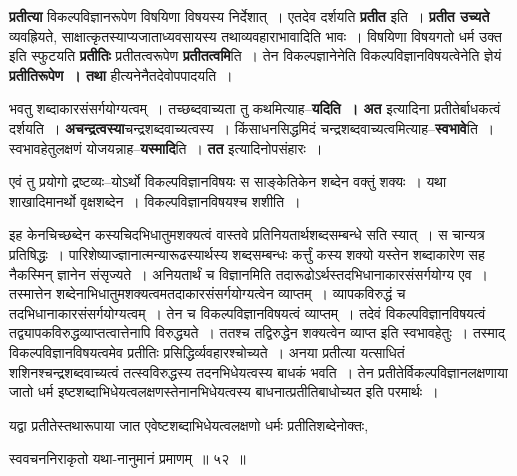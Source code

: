 \documentclass[article,12pt,a4paper]{memoir}
\begin{document}
	  \endgroup
	

	  \pstart \textbf{प्रतीत्या} विकल्पविज्ञानरूपेण विषयिणा विषयस्य निर्देशात् । एतदेव दर्शयति \textbf{प्रतीत} इति । \textbf{प्रतीत उच्यते} व्यवह्रियते, साक्षात्कृतस्याप्यजाताध्यवसायस्य तथाव्यवहाराभावादिति भावः । विषयिणा विषयगतो धर्म उक्त इति स्फुटयति \textbf{प्रतीतिः} प्रतीतत्वरूपेण \textbf{प्रतीतत्वमि}ति । तेन विकल्पज्ञानेनेति विकल्पविज्ञानविषयत्वेनेति ज्ञेयं \textbf{प्रतीतिरूपेण । तथा} हीत्यनेनैतदेवोपपादयति ।
	\pend
      

	  \pstart भवतु शब्दाकारसंसर्गयोग्यत्वम् । तच्छब्दवाच्यता तु कथमित्याह--\textbf{यदिति । अत} इत्यादिना प्रतीतेर्बाधकत्वं दर्शयति । \textbf{अचन्द्रत्वस्या}चन्द्रशब्दवाच्यत्वस्य । किंसाधनसिद्धमिदं चन्द्रशब्दवाच्यत्वमित्याह--\textbf{स्वभावे}ति । स्वभावहेतुलक्षणं योजयन्नाह--\textbf{यस्मादि}ति । \textbf{तत} इत्यादिनोपसंहारः ।
	\pend
      

	  \pstart एवं तु प्रयोगो द्रष्टव्यः--योऽर्थो विकल्पविज्ञानविषयः स साङ्केतिकेन शब्देन वक्तुं शक्यः । यथा शाखादिमानर्थो वृक्षशब्देन । विकल्पविज्ञानविषयश्च शशीति ।
	\pend
      

	  \pstart इह केनचिच्छब्देन कस्यचिदभिधातुमशक्यत्वं वास्तवे प्रतिनियतार्थशब्दसम्बन्धे सति स्यात् । स चान्यत्र प्रतिषिद्धः । पारिशेष्याज्ज्ञानात्मन्यारूढस्यार्थस्य शब्दसम्बन्धः कर्त्तुं कस्य शक्यो यस्तेन शब्दाकारेण सह नैकस्मिन् ज्ञानेन संसृज्यते । अनियतार्थं च विज्ञानमिति तदारूढोऽर्थस्तदभिधानाकारसंसर्गयोग्य एव । तस्मात्तेन शब्देनाभिधातुमशक्यत्वमतदाकारसंसर्गयोग्यत्वेन व्याप्तम् । व्या\leavevmode{}पकविरुद्धं च तदभिधानाकारसंसर्गयोग्यत्वम् । तेन च विकल्पविज्ञानविषयत्वं व्याप्तम् । तदेवं विकल्पविज्ञानविषयत्वं तद्व्यापकविरुद्धव्याप्तत्वात्तेनापि विरुद्ध्यते । ततश्च तद्विरुद्धेन शक्यत्वेन व्याप्त इति स्वभावहेतुः । तस्माद् विकल्पविज्ञानविषयत्वमेव प्रतीतिः प्रसिद्धिर्व्यवहारश्चोच्यते । अनया प्रतीत्या यत्साधितं शशिनश्चन्द्रशब्दवाच्यत्वं तत्स्वविरुद्धस्य तदनभिधेयत्वस्य बाधकं भवति । तेन प्रतीतेर्विकल्पविज्ञानलक्षणाया जातो धर्म इष्टशब्दाभिधेयत्वलक्षणस्तेनानभिधेयत्वस्य बाधनात्प्रतीतिबाधोच्यत इति परमार्थः ।
	\pend
      

	  \pstart यद्वा प्रतीतेस्तथारूपाया जात एवेष्टशब्दाभिधेयत्वलक्षणो धर्मः प्रतीतिशब्देनोक्तः,  \leavevmode{} 
	  
	स्ववचननिराकृतो यथा-नानुमानं प्रमाणम् ॥ ५२ ॥ 
	  
\end{document}
